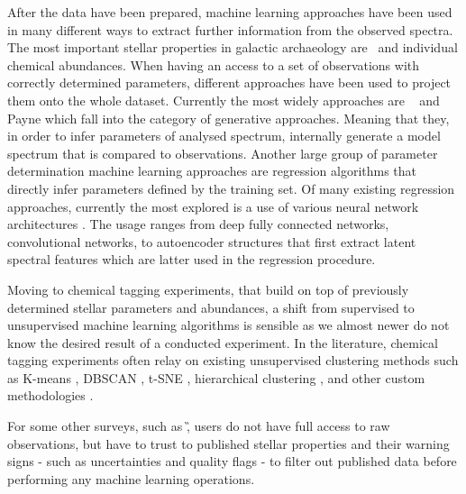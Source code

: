 After the data have been prepared, machine learning approaches have been used in many different ways to extract further information from the observed spectra. The most important stellar properties in galactic archaeology are \Feh\ and individual chemical abundances. When having an access to a set of observations with correctly determined parameters, different approaches have been used to project them onto the whole dataset. Currently the most widely approaches are \TC\ \cite{2015ApJ...808...16N, buder2018} and Payne \citep{2019ApJ...879...69T} which fall into the category of generative approaches. Meaning that they, in order to infer parameters of analysed spectrum, internally generate a model spectrum that is compared to observations. Another large group of parameter determination machine learning approaches are regression algorithms that directly infer parameters defined by the training set. Of many existing regression approaches, currently the most explored is a use of various neural network architectures \citep{2015MNRAS.452..158Y, 2019MNRAS.483.3255L, 2020ApJ...891...23W, 2020arXiv200208390O}. The usage ranges from deep fully connected networks, convolutional networks, to autoencoder structures that first extract latent spectral features which are latter used in the regression procedure.

Moving to chemical tagging experiments, that build on top of previously determined stellar parameters and abundances, a shift from supervised to unsupervised machine learning algorithms is sensible as we almost newer do not know the desired result of a conducted experiment. In the literature, chemical tagging experiments often relay on existing unsupervised clustering methods such as K-means \cite{2015A&A...577A..47B, 2016ApJ...833..262H, 2018ApJ...860...70C}, DBSCAN \cite{2019MNRAS.487..871P}, t-SNE \cite{2018MNRAS.473.4612K, 2018A&A...619A.125A}, hierarchical clustering \cite{2017MNRAS.467.1140J, 2018A&A...618A..65B}, and other custom methodologies \cite{2019ApJ...887...73C}.

For some other surveys, such as \G, users do not have full access to raw observations, but have to trust to published stellar properties and their warning signs - such as uncertainties and quality flags - to filter out published data before performing any machine learning operations. 



